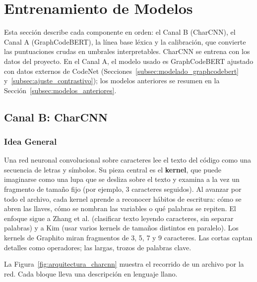 \section{Entrenamiento de Modelos}
\label{sec:entrenamiento_modelos}

Esta sección describe cada componente en orden: el Canal B (CharCNN), el Canal A (GraphCodeBERT), la línea base léxica y la calibración, que convierte las puntuaciones crudas en umbrales interpretables. CharCNN se entrena con los datos del proyecto. En el Canal A, el modelo usado es GraphCodeBERT ajustado con datos externos de CodeNet (Secciones~\ref{subsec:modelado_graphcodebert} y~\ref{subsec:ajuste_contrastivo}); los modelos anteriores se resumen en la Sección~\ref{subsec:modelos_anteriores}.

\subsection{Canal B: CharCNN}
\label{subsec:modelado_charcnn}

\subsubsection{Idea General}
Una  red neuronal convolucional sobre caracteres lee el texto del código como una secuencia de letras y símbolos. Su pieza central es el \textbf{kernel}, que puede imaginarse como una lupa que se desliza sobre el texto y examina a la vez un fragmento de tamaño fijo (por ejemplo, 3 caracteres seguidos). Al avanzar por todo el archivo, cada kernel aprende a reconocer hábitos de escritura: cómo se abren las llaves, cómo se nombran las variables o qué palabras se repiten. El enfoque sigue a Zhang et al. \cite{Zhang2015CharCNN} (clasificar texto leyendo caracteres, sin separar palabras) y a Kim \cite{Kim2014CNN} (usar varios kernels de tamaños distintos en paralelo). Los kernels de Graphito miran fragmentos de 3, 5, 7 y 9 caracteres. Las cortas captan detalles como operadores; las largas, trozos de palabras clave.

La Figura~\ref{fig:arquitectura_charcnn} muestra el recorrido de un archivo por la red. Cada bloque lleva una descripción en lenguaje llano.

